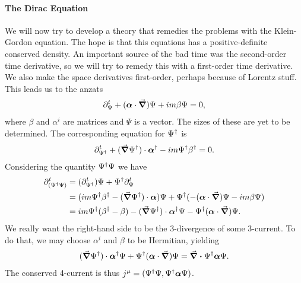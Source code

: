 \paragraph{The Dirac Equation}
We will now try to develop a theory that remedies the problems with the Klein-Gordon equation. The hope is that this equations has a positive-definite conserved density. An important source of the bad time was the second-order time derivative, so we will try to remedy this with a first-order time derivative. We also make the space derivatives first-order, perhaps because of Lorentz stuff. This leads us to the anzats
\begin{align*}
	\partial^{t}_{\Psi}+ (\vb*{\alpha}\cdot\grad{})\Psi + im\beta\Psi = 0,
\end{align*}
where $\beta$ and $\alpha^{i}$ are matrices and $\Psi$ is a vector. The sizes of these are yet to be determined. The corresponding equation for $\Psi^{\dagger}$ is
\begin{align*}
	\partial^{t}_{\Psi^{\dagger}}+ (\grad{\Psi^{\dagger}})\cdot\vb*{\alpha}^{\dagger} - im\Psi^{\dagger}\beta^{\dagger} = 0.
\end{align*}
Considering the quantity $\Psi^{\dagger}\Psi$ we have
\begin{align*}
	\del{t}{(\Psi\adj\Psi)} &= (\del{t}{\Psi\adj})\Psi + \Psi\adj\del{t}{\Psi} \\
	                        &= (im\Psi\adj\beta\adj - (\grad{\Psi\adj})\cdot\vb*{\alpha})\Psi + \Psi\adj(-(\vb*{\alpha}\cdot\grad{})\Psi - im\beta\Psi) \\
	                        &= im\Psi\adj(\beta\adj - \beta) - (\grad{\Psi\adj})\cdot\vb*{\alpha}\adj\Psi - \Psi\adj(\vb*{\alpha}\cdot\grad{})\Psi.
\end{align*}
We really want the right-hand side to be the 3-divergence of some 3-current. To do that, we may choose $\alpha^{i}$ and $\beta$ to be Hermitian, yielding
\begin{align*}
	(\grad{\Psi^{\dagger}})\cdot\vb*{\alpha}^{\dagger}\Psi + \Psi^{\dagger}(\vb*{\alpha}\cdot\grad{})\Psi = \div{\Psi^{\dagger}\vb*{\alpha}\Psi}.
\end{align*}
The conserved 4-current is thus $j^{\mu} = (\Psi^{\dagger}\Psi, \Psi^{\dagger}\vb*{\alpha}\Psi)$.

